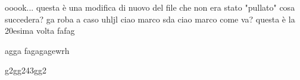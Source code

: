 \usepackage{pdfcomment}


    ooook... questa è una modifica di nuovo del file che non era stato "pullato" cosa succedera?
ga    roba a caso 
uhljl
ciao marco sda
ciao marco come va? questa è la 20esima volta 
    fafag
    

    agga
    fagagagewrh


    g2gg243gg2
